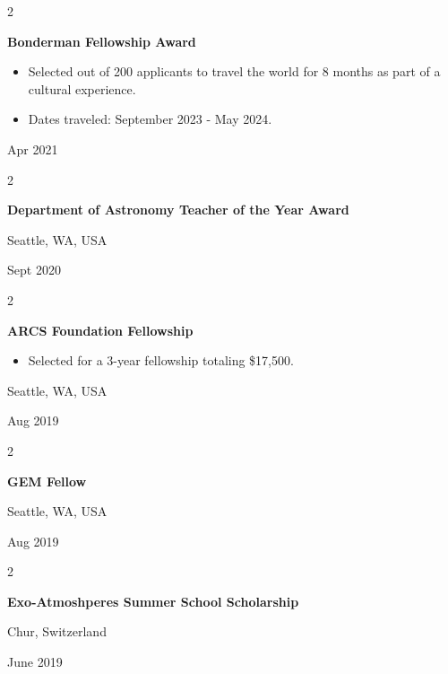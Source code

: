 \documentclass[10pt, letterpaper]{article}
\newenvironment{highlights}{
    \begin{itemize}[
        topsep=0.10 cm,
        parsep=0.10 cm,
        partopsep=0pt,
        itemsep=0pt,
        leftmargin=0.4 cm + 10pt
    ]
}{
    \end{itemize}
} %
\newenvironment{twocolentry}[2][]{
    \onecolentry
    \def\secondColumn{#2}
    \setcolumnwidth{\fill, 4.5 cm}
    \begin{paracol}{2}
}{
    \switchcolumn \raggedleft \secondColumn
    \end{paracol}
    \endonecolentry
} %
\begin{document}
        \vspace{0.2 cm}

        \begin{twocolentry}{
            Apr 2021
        }
            \textbf{Bonderman Fellowship Award}
            \begin{highlights}
                \item Selected out of 200 applicants to travel the world for 8 months as part of a cultural experience.
                \item Dates traveled: September 2023 - May 2024.
            \end{highlights}
        \end{twocolentry}


        \vspace{0.2 cm}

        \begin{twocolentry}{
            Seattle, WA, USA

        Sept 2020
        }
            \textbf{Department of Astronomy Teacher of the Year Award}
        \end{twocolentry}


        \vspace{0.2 cm}

        \begin{twocolentry}{
            Seattle, WA, USA

        Aug 2019
        }
            \textbf{ARCS Foundation Fellowship}
            \begin{highlights}
                \item Selected for a 3-year fellowship totaling \$17,500.
            \end{highlights}
        \end{twocolentry}


        \vspace{0.2 cm}

        \begin{twocolentry}{
            Seattle, WA, USA

        Aug 2019
        }
            \textbf{GEM Fellow}
        \end{twocolentry}


        \vspace{0.2 cm}

        \begin{twocolentry}{
            Chur, Switzerland

        June 2019
        }
            \textbf{Exo-Atmoshperes Summer School Scholarship}
        \end{twocolentry}
\end{document}
